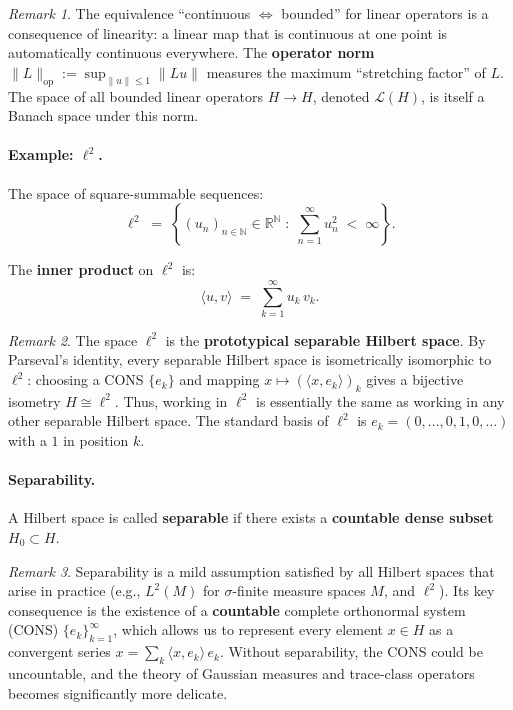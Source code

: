 \documentclass[11pt]{article}
\theoremstyle{definition}
\theoremstyle{remark}
\newtheorem{remark}{Remark}
\begin{document}
\begin{remark}
The equivalence ``continuous $\Leftrightarrow$ bounded'' for
linear operators is a consequence of linearity: a linear map that
is continuous at one point is automatically continuous everywhere.
The \textbf{operator norm} $\|L\|_{\mathrm{op}} :=
\sup_{\|u\| \le 1} \|Lu\|$ measures the maximum ``stretching
factor'' of $L$.  The space of all bounded linear operators
$H \to H$, denoted $\mathcal{L}(H)$, is itself a Banach space
under this norm.
\end{remark}

\paragraph{Example: $\ell^2$.}

The space of square-summable sequences:
\[
    \ell^2
    \;=\;
    \left\{
        (u_n)_{n \in \mathbb{N}} \in \mathbb{R}^{\mathbb{N}}
        \;:\;
        \sum_{n=1}^{\infty} u_n^2 \;<\; \infty
    \right\}.
\]

The \textbf{inner product} on $\ell^2$ is:
\[
    \langle u, v \rangle
    \;=\;
    \sum_{k=1}^{\infty} u_k\,v_k.
\]

\begin{remark}
The space $\ell^2$ is the \textbf{prototypical separable Hilbert
space}.  By Parseval's identity, every separable Hilbert space
is isometrically isomorphic to $\ell^2$: choosing a CONS
$\{e_k\}$ and mapping $x \mapsto (\langle x, e_k\rangle)_k$
gives a bijective isometry $H \cong \ell^2$.  Thus, working in
$\ell^2$ is essentially the same as working in any other separable
Hilbert space.  The standard basis of $\ell^2$ is
$e_k = (0,\ldots,0,1,0,\ldots)$ with a $1$ in position $k$.
\end{remark}

\paragraph{Separability.}

A Hilbert space is called \textbf{separable} if there exists a
\textbf{countable dense subset} $H_0 \subset H$.

\begin{remark}
Separability is a mild assumption satisfied by all Hilbert spaces
that arise in practice (e.g., $L^2(M)$ for $\sigma$-finite
measure spaces $M$, and $\ell^2$).  Its key consequence is the
existence of a \textbf{countable} complete orthonormal system
(CONS) $\{e_k\}_{k=1}^\infty$, which allows us to represent
every element $x \in H$ as a convergent series
$x = \sum_k \langle x, e_k \rangle\, e_k$.  Without separability,
the CONS could be uncountable, and the theory of Gaussian
measures and trace-class operators becomes significantly more
delicate.
\end{remark}
\end{document}
